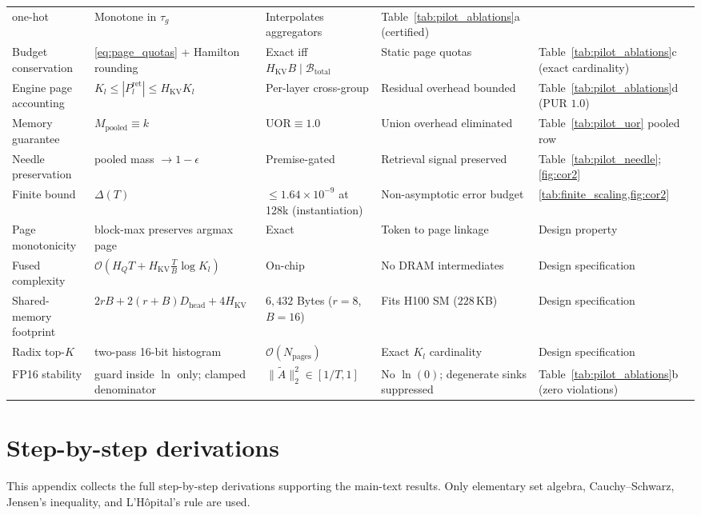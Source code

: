 \documentclass[final,5p,times,twocolumn]{elsarticle}
\theoremstyle{definition}
\theoremstyle{remark}
\newcommand{\HQ}{H_{Q}}
\newcommand{\HKV}{H_{\mathrm{KV}}}
\newcommand{\Dhead}{D_{\mathrm{head}}}
\newcommand{\UOR}{\mathrm{UOR}}
\begin{document}
\begin{table}[t]
\begin{tabular}{@{}p{} p{} p{} p{} p{}@{}}
 one-hot & Monotone in $\tau_g$ & Interpolates aggregators &
 Table~\ref{tab:pilot_ablations}a (certified) \\
Budget conservation & \cref{eq:page_quotas} + Hamilton rounding &
 Exact iff $\HKV B \mid \mathcal{B}_{\mathrm{total}}$ & Static page
 quotas & Table~\ref{tab:pilot_ablations}c (exact cardinality) \\
Engine page accounting & $K_l \le |P^{\mathrm{ret}}_l| \le \HKV K_l$ &
 Per-layer cross-group & Residual overhead bounded &
 Table~\ref{tab:pilot_ablations}d (PUR $1.0$) \\
Memory guarantee & $M_{\mathrm{pooled}} \equiv k$ & $\UOR \equiv 1.0$ &
 Union overhead eliminated & Table~\ref{tab:pilot_uor} pooled row \\
Needle preservation & pooled mass $\to 1-\epsilon$ & Premise-gated &
 Retrieval signal preserved & Table~\ref{tab:pilot_needle};
 \cref{fig:cor2} \\
Finite bound & $\Delta(T)$ & $\le 1.64\times 10^{-9}$ at 128k
 (instantiation) & Non-asymptotic error budget &
 \cref{tab:finite_scaling,fig:cor2} \\
Page monotonicity & block-max preserves argmax page & Exact & Token to
 page linkage & Design property \\
Fused complexity & $\mathcal{O}(\HQ T + \HKV\tfrac{T}{B}\log K_l)$ &
 On-chip & No DRAM intermediates & Design specification \\
Shared-memory footprint & $2rB + 2(r{+}B)\Dhead + 4\HKV$ & $6{,}432$  Bytes ($r{=}8$, $B{=}16$) & Fits H100 SM ($228$\,KB) & Design
 specification \\
Radix top-$K$ & two-pass 16-bit histogram &
 $\mathcal{O}(N_{\mathrm{pages}})$ & Exact $K_l$ cardinality & Design
 specification \\
FP16 stability & guard inside $\ln$ only; clamped denominator &
 $\|\tilde A\|_2^2 \in [1/T,1]$ & No $\ln(0)$; degenerate sinks
 suppressed & Table~\ref{tab:pilot_ablations}b (zero violations) \\
\bottomrule
\end{tabular}
\end{table}

\section{Step-by-step derivations}
\label{app:derivations}

This appendix collects the full step-by-step derivations supporting the
main-text results. Only elementary set algebra, Cauchy--Schwarz,
Jensen's inequality, and L'H\^opital's rule are used.
\end{document}
